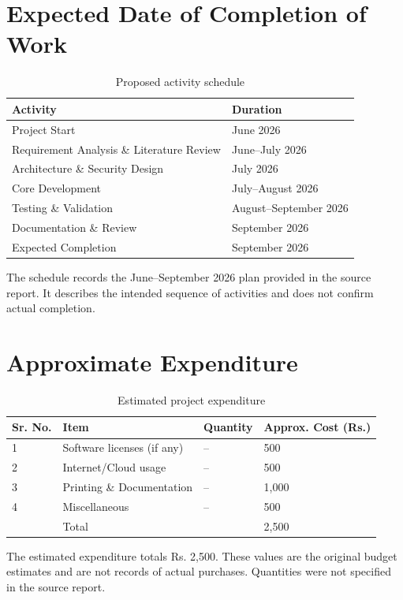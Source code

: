 \documentclass[12pt,a4paper,oneside]{report}
\begin{document}
\section{Expected Date of Completion of Work}
\begin{table}[H]
\centering
\caption{Proposed activity schedule}
\label{tab:schedule}
\small
\begin{tabularx}{\linewidth}{@{}X p{.30\linewidth}@{}}
\toprule
\textbf{Activity} & \textbf{Duration} \\
\midrule
Project Start & June 2026 \\
Requirement Analysis \& Literature Review & June–July 2026 \\
Architecture \& Security Design & July 2026 \\
Core Development & July–August 2026 \\
Testing \& Validation & August–September 2026 \\
Documentation \& Review & September 2026 \\
Expected Completion & September 2026 \\
\bottomrule
\end{tabularx}
\end{table}
The schedule records the June–September 2026 plan provided in the source report. It describes the intended sequence of activities and does not confirm actual completion.
\section{Approximate Expenditure}
\begin{table}[H]
\centering
\caption{Estimated project expenditure}
\label{tab:budget}
\small
\begin{tabularx}{\linewidth}{@{}p{.09\linewidth}X p{.14\linewidth}p{.19\linewidth}@{}}
\toprule
\textbf{Sr. No.} & \textbf{Item} & \textbf{Quantity} & \textbf{Approx. Cost (Rs.)} \\
\midrule
1 & Software licenses (if any) & -- & 500 \\
2 & Internet/Cloud usage & -- & 500 \\
3 & Printing \& Documentation & -- & 1,000 \\
4 & Miscellaneous & -- & 500 \\
 & Total &  & 2,500 \\
\bottomrule
\end{tabularx}
\end{table}
The estimated expenditure totals Rs. 2,500. These values are the original budget estimates and are not records of actual purchases. Quantities were not specified in the source report.
\end{document}
